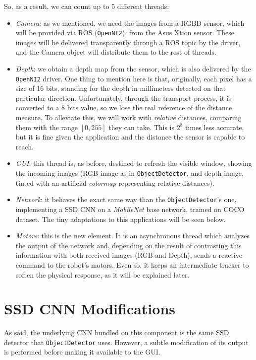 	So, as a result, we can count up to 5 different threads:
	\begin{itemize}
		\item \emph{Camera}: as we mentioned, we need the images from a RGBD sensor, which will be provided via ROS (\texttt{OpenNI2}), from the Asus Xtion sensor. These images will be delivered transparently through a ROS topic by the driver, and the Camera object will distribute them to the rest of threads.
		
		\item \emph{Depth}: we obtain a depth map from the sensor, which is also delivered by the \texttt{OpenNI2} driver. One thing to mention here is that, originally, each pixel has a size of 16 bits, standing for the depth in millimeters detected on that particular direction. Unfortunately, through the transport process, it is converted to a 8 bits value, so we lose the real reference of the distance measure. To alleviate this, we will work with \emph{relative} distances, comparing them with the range $[0,255]$ they can take. This is $2^8$ times less accurate, but it is fine given the application and the distance the sensor is capable to reach.
		
		\item \emph{GUI}: this thread is, as before, destined to refresh the visible window, showing the incoming images (RGB image as in \texttt{ObjectDetector}, and depth image, tinted with an artificial \emph{colormap} representing relative distances). 
		
		\item \emph{Network}: it behaves the exact same way than the \texttt{ObjectDetector}'s one, implementing a SSD CNN on a \emph{MobileNet} base network, trained on COCO dataset. The tiny adaptations to this applications will be seen below.
		
		\item \emph{Motors}: this is the new element. It is an asynchronous thread which analyzes the output of the network and, depending on the result of contrasting this information with both received images (RGB and Depth), sends a reactive command to the robot's motors. Even so, it keeps an intermediate tracker to soften the physical response, as it will be explained later.
	\end{itemize}
	
	
\section{SSD CNN Modifications}
	As said, the underlying CNN bundled on this component is the same SSD detector that \texttt{ObjectDetector} uses. However, a subtle modification of its output is performed before making it available to the GUI.\\
	
